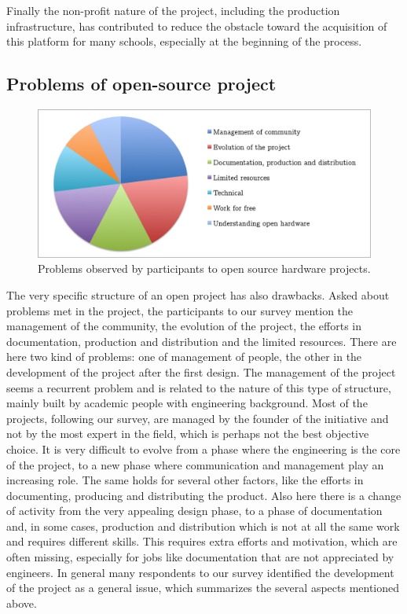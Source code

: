 \documentclass[letterpaper, 10 pt, conference]{ieeeconf}  %
\begin{document}
Finally the non-profit nature of the project, including the production infrastructure, has contributed to reduce the obstacle toward the acquisition of this platform for many schools, especially at the beginning of the process.

\subsection{Problems of open-source project}

\begin{figure}
\centering
\includegraphics[width=\columnwidth]{figures/problems}
\caption{Problems observed by participants to open source hardware projects.}
\label{fig:problems}
\end{figure}

The very specific structure of an open project has also drawbacks. 
Asked about problems met in the project, the participants to our survey mention the management of the community, the evolution of the project, the efforts in documentation, production and distribution and the limited resources.
There are here two kind of problems: one of management of people, the other in the development of the project after the first design.
The management of the project seems a recurrent problem and is related to the nature of this type of structure, mainly built by academic people with engineering background. 
Most of the projects, following our survey, are managed by the founder of the initiative and not by the most expert in the field, which is perhaps not the best objective choice.
It is very difficult to evolve from a phase where the engineering is the core of the project, to a new phase where communication and management play an increasing role.
The same holds for several other factors, like the efforts in documenting, producing and distributing the product. 
Also here there is a change of activity from the very appealing design phase, to a phase of documentation and, in some cases, production and distribution which is not at all the same work and requires different skills.
This requires extra efforts and motivation, which are often missing, especially for jobs like documentation that are not appreciated by engineers.
In general many respondents to our survey identified the development of the project as a general issue, which summarizes the several aspects mentioned above.
\end{document}

